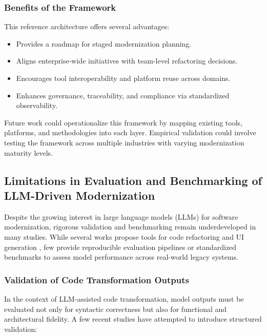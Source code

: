\documentclass[12pt]{article}
\begin{document}
\subsubsection{Benefits of the Framework}

This reference architecture offers several advantages:
\begin{itemize}
    \item Provides a roadmap for staged modernization planning.
    \item Aligns enterprise-wide initiatives with team-level refactoring decisions.
    \item Encourages tool interoperability and platform reuse across domains.
    \item Enhances governance, traceability, and compliance via standardized observability.
\end{itemize}

Future work could operationalize this framework by mapping existing tools, platforms, and methodologies into each layer. Empirical validation could involve testing the framework across multiple industries with varying modernization maturity levels.

\subsection{Limitations in Evaluation and Benchmarking of LLM-Driven Modernization}

Despite the growing interest in large language models (LLMs) for software modernization, rigorous validation and benchmarking remain underdeveloped in many studies. While several works propose tools for code refactoring \cite{geng2024, talasila2023} and UI generation \cite{wu2024uicoder, liu2024crowdgenui}, few provide reproducible evaluation pipelines or standardized benchmarks to assess model performance across real-world legacy systems.

\subsubsection{Validation of Code Transformation Outputs}

In the context of LLM-assisted code transformation, model outputs must be evaluated not only for syntactic correctness but also for functional and architectural fidelity. A few recent studies have attempted to introduce structured validation:
\end{document}
